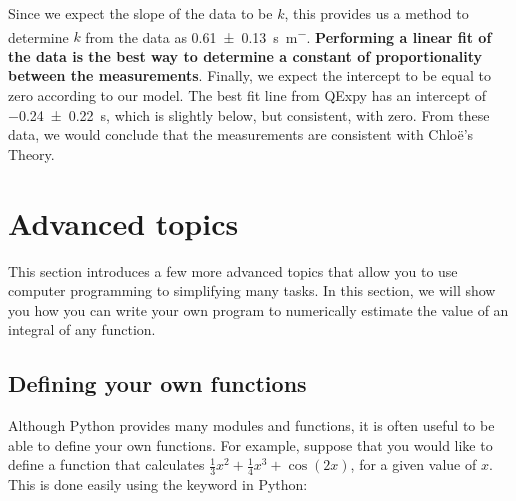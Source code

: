 Since we expect the slope of the data to be $k$, this provides us a method to determine $k$ from the data as \SI{0.61\pm 0.13}{s.m^{-}}. \textbf{Performing a linear fit of the data is the best way to determine a constant of proportionality between the measurements}. Finally, we expect the intercept to be equal to zero according to our model. The best fit line from QExpy has an intercept of \SI{-0.24\pm 0.22}{s}, which is slightly below, but consistent, with zero. From these data, we would conclude that the measurements are consistent with Chlo\"e's Theory. 

\section{Advanced topics}
This section introduces a few more advanced topics that allow you to use computer programming to simplifying many tasks. In this section, we will show you how you can write your own program to numerically estimate the value of an integral of any function.
\subsection{Defining your own functions}
Although Python provides many modules and functions, it is often useful to be able to define your own functions. For example, suppose that you would like to define a function that calculates $\frac{1}{3}x^2+\frac{1}{4}x^3+\cos(2x)$, for a given value of $x$. This is done easily using the  keyword in Python:

